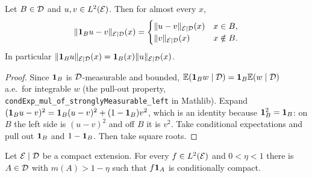 \begin{lemma}
  \label{lem:cnorm-pullout}
  \leanok
  Let $B \in \mathcal{D}$ and $u, v \in L^2(\mathcal{E})$.  Then for almost every $x$,
  \[
    \lVert \mathbf{1}_B u - v \rVert_{\mathcal{E} \mid \mathcal{D}}(x) =
    \begin{cases}
      \lVert u - v \rVert_{\mathcal{E} \mid \mathcal{D}}(x) & x \in B , \\
      \lVert v \rVert_{\mathcal{E} \mid \mathcal{D}}(x) & x \notin B .
    \end{cases}
  \]
  In particular $\lVert \mathbf{1}_B u \rVert_{\mathcal{E} \mid \mathcal{D}}(x) = \mathbf{1}_B(x)\lVert u \rVert_{\mathcal{E} \mid \mathcal{D}}(x)$.
\end{lemma}

\begin{proof}
  Since $\mathbf{1}_B$ is $\mathcal{D}$-measurable and bounded, $\mathbb{E}(\mathbf{1}_B w \mid \mathcal{D}) = \mathbf{1}_B \mathbb{E}(w\mid\mathcal{D})$
  a.e.\ for integrable $w$ (the pull-out property, \texttt{condExp\_mul\_of\_stronglyMeasurable\_left}
  in Mathlib).  Expand
  $(\mathbf{1}_Bu - v)^2 = \mathbf{1}_B(u-v)^2 + (1-\mathbf{1}_B)v^2$, which is an identity because
  $\mathbf{1}_B^2 = \mathbf{1}_B$: on $B$ the left side is $(u-v)^2$ and off $B$ it is $v^2$.  Take
  conditional expectations and pull out $\mathbf{1}_B$ and $1 - \mathbf{1}_B$.  Then take square roots.
\end{proof}

\begin{lemma}[Localization]
  \label{lem:localize}
  \leanok
  Let $\mathcal{E} \mid \mathcal{D}$ be a compact extension.  For every $f \in L^2(\mathcal{E})$ and
  $0 < \eta < 1$ there is $A \in \mathcal{D}$ with $m(A) > 1-\eta$ such that $f\mathbf{1}_A$ is
  conditionally compact.
\end{lemma}

